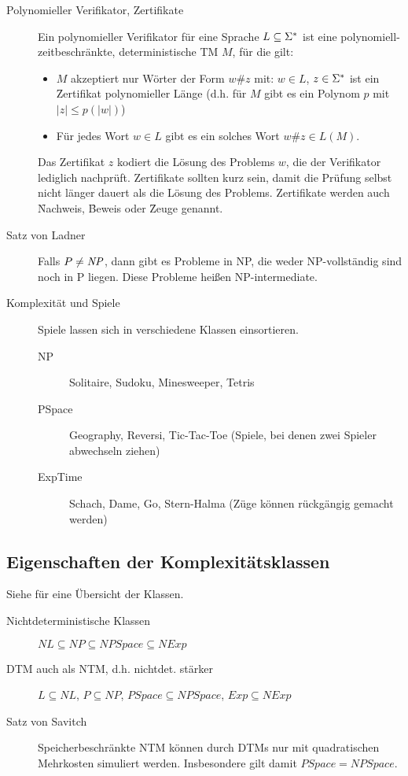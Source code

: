 \begin{description}
        \item[Polynomieller Verifikator, Zertifikate] Ein polynomieller Verifikator für eine Sprache $L \subseteq \Sigma^{*}$ ist eine polynomiell-zeitbeschränkte, deterministische TM $M$, für die gilt:
            \begin{itemize}
                \item $M$ akzeptiert nur Wörter der Form $w\#z$ mit: $w \in L$, $z \in \Sigma^{*}$ ist ein \f{Zertifikat} polynomieller Länge (d.h. für $M$ gibt es ein Polynom $p$ mit $|z| \leq p(|w|)$)

                \item Für jedes Wort $w \in L$ gibt es ein solches Wort $w\#z \in L(M)$.
            \end{itemize}
            Das Zertifikat $z$ kodiert die Lösung des Problems $w$, die der Verifikator lediglich nachprüft. Zertifikate sollten kurz sein, damit die Prüfung selbst nicht länger dauert als die Lösung des Problems. Zertifikate werden auch \f{Nachweis}, \f{Beweis} oder \f{Zeuge} genannt. 

        \item[Satz von Ladner] Falls $P \neq \mathit{NP}$, dann gibt es Probleme in NP, die weder NP-vollständig sind noch in P liegen. Diese Probleme heißen NP-intermediate. 

        \item[Komplexität und Spiele] Spiele lassen sich in verschiedene Klassen einsortieren. 
            \begin{description}
                \item[NP] Solitaire, Sudoku, Minesweeper, Tetris
                \item[PSpace] Geography, Reversi, Tic-Tac-Toe (Spiele, bei denen zwei Spieler abwechseln ziehen)
                \item[ExpTime] Schach, Dame, Go, Stern-Halma (Züge können rückgängig gemacht werden)
            \end{description}
    \end{description}


\subsection{Eigenschaften der Komplexitätsklassen}
    Siehe  für eine Übersicht der Klassen. 
    \begin{description}
        \item[Nichtdeterministische Klassen] $NL \subseteq NP \subseteq NPSpace \subseteq NExp$
        \item[DTM auch als NTM, d.h. nichtdet. stärker] $L \subseteq NL$, $P \subseteq NP$, $\mathit{PSpace} \subseteq \mathit{NPSpace}$, $Exp \subseteq NExp$
        \item[Satz von Savitch] Speicherbeschränkte NTM können durch DTMs nur mit  quadratischen Mehrkosten simuliert werden. Insbesondere gilt damit $\mathit{PSpace} = \mathit{NPSpace}$.
    \end{description}

